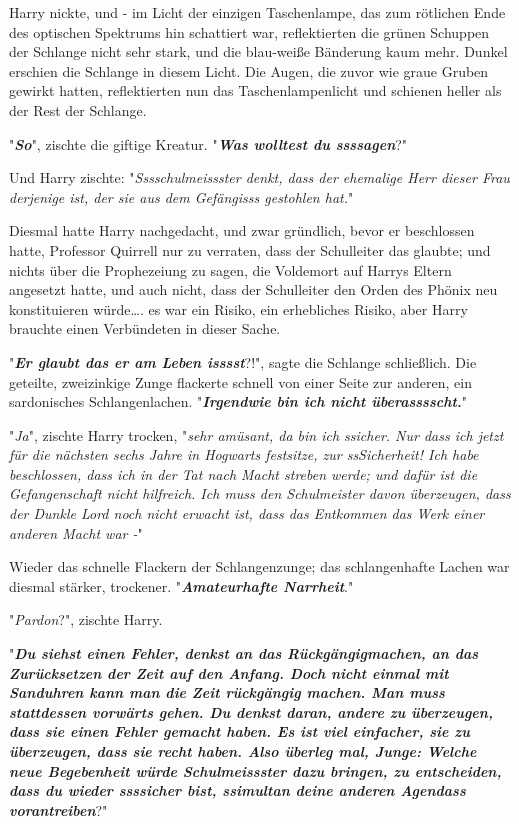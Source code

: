 {Harry nickte, und - im Licht der einzigen Taschenlampe, das zum rötlichen Ende des optischen Spektrums hin schattiert war, reflektierten die grünen Schuppen der Schlange nicht sehr stark, und die blau-weiße Bänderung kaum mehr. Dunkel erschien die Schlange in diesem Licht. Die Augen, die zuvor wie graue Gruben gewirkt hatten, reflektierten nun das Taschenlampenlicht und schienen heller als der Rest der Schlange.

"\textbf{\emph{So}}", zischte die giftige Kreatur. "\textbf{\emph{Was wolltest du ssssagen}}?"

Und Harry zischte: "\emph{Sssschulmeissster denkt, dass der ehemalige Herr dieser Frau derjenige ist, der sie aus dem Gefängisss gestohlen hat.}"

Diesmal hatte Harry nachgedacht, und zwar gründlich, bevor er beschlossen hatte, Professor Quirrell nur zu verraten, dass der Schulleiter das glaubte; und nichts über die Prophezeiung zu sagen, die Voldemort auf Harrys Eltern angesetzt hatte, und auch nicht, dass der Schulleiter den Orden des Phönix neu konstituieren würde…. es war ein Risiko, ein erhebliches Risiko, aber Harry brauchte einen Verbündeten in dieser Sache.

"\textbf{\emph{Er glaubt das er am Leben isssst}}?!", sagte die Schlange schließlich. Die geteilte, zweizinkige Zunge flackerte schnell von einer Seite zur anderen, ein sardonisches Schlangenlachen. "\textbf{\emph{Irgendwie bin ich nicht überasssscht.}}"

"\emph{Ja}", zischte Harry trocken, "\emph{sehr amüsant, da bin ich ssicher. Nur dass ich jetzt für die nächsten sechs Jahre in Hogwarts festsitze, zur ssSicherheit! Ich habe beschlossen, dass ich in der Tat nach Macht streben werde; und dafür ist die Gefangenschaft nicht hilfreich. Ich muss den Schulmeister davon überzeugen, dass der Dunkle Lord noch nicht erwacht ist, dass das Entkommen das Werk einer anderen Macht war -}"

Wieder das schnelle Flackern der Schlangenzunge; das schlangenhafte Lachen war diesmal stärker, trockener. "\textbf{\emph{Amateurhafte Narrheit}}."

"\emph{Pardon}?", zischte Harry.

"\textbf{\emph{Du siehst einen Fehler, denkst an das Rückgängigmachen, an das Zurücksetzen der Zeit auf den Anfang. Doch nicht einmal mit Sanduhren kann man die Zeit rückgängig machen. Man muss stattdessen vorwärts gehen. Du denkst daran, andere zu überzeugen, dass sie einen Fehler gemacht haben. Es ist viel einfacher, sie zu überzeugen, dass sie recht haben. Also überleg mal, Junge: Welche neue Begebenheit würde Schulmeissster dazu bringen, zu entscheiden, dass du wieder ssssicher bist, ssimultan deine anderen Agendass vorantreiben}}?"

}
